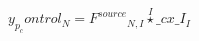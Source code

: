 \documentclass[border=2pt]{standalone}
\begin{document}
${y_p_control}{_{N}}={{F^{source}}}{_{N, I}} \stackrel{I}{\star} {\_cx\_I}{_{I}}$
\end{document}
